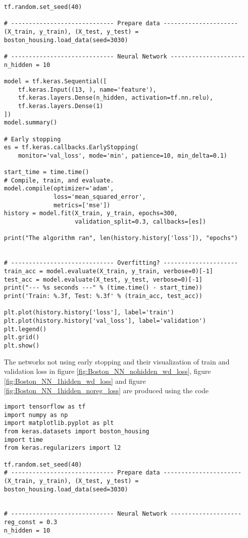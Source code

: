 \begin{appendices}
\begin{lstlisting}
tf.random.set_seed(40)

# ----------------------------- Prepare data ---------------------
(X_train, y_train), (X_test, y_test) = boston_housing.load_data(seed=3030)

# ----------------------------- Neural Network ---------------------
n_hidden = 10

model = tf.keras.Sequential([
    tf.keras.Input((13, ), name='feature'),
    tf.keras.layers.Dense(n_hidden, activation=tf.nn.relu),
    tf.keras.layers.Dense(1)
])
model.summary()

# Early stopping
es = tf.keras.callbacks.EarlyStopping(
    monitor='val_loss', mode='min', patience=10, min_delta=0.1)

start_time = time.time()
# Compile, train, and evaluate.
model.compile(optimizer='adam',
              loss='mean_squared_error',
              metrics=['mse'])
history = model.fit(X_train, y_train, epochs=300,
                    validation_split=0.3, callbacks=[es])

print("The algorithm ran", len(history.history['loss']), "epochs")


# ----------------------------- Overfitting? ---------------------
train_acc = model.evaluate(X_train, y_train, verbose=0)[-1]
test_acc = model.evaluate(X_test, y_test, verbose=0)[-1]
print("--- %s seconds ---" % (time.time() - start_time))
print('Train: %.3f, Test: %.3f' % (train_acc, test_acc))

plt.plot(history.history['loss'], label='train')
plt.plot(history.history['val_loss'], label='validation')
plt.legend()
plt.grid()
plt.show()

\end{lstlisting}
The networks not using early stopping and their visualization of train and validation loss in figure \ref{fig:Boston_NN_nohidden_wd_loss}, figure \ref{fig:Boston_NN_1hidden_wd_loss} and figure \ref{fig:Boston_NN_1hidden_noreg_loss} are produced using the code
\begin{lstlisting}
import tensorflow as tf
import numpy as np
import matplotlib.pyplot as plt
from keras.datasets import boston_housing
import time
from keras.regularizers import l2

tf.random.set_seed(40)
# ----------------------------- Prepare data ----------------------
(X_train, y_train), (X_test, y_test) = boston_housing.load_data(seed=3030)


# ----------------------------- Neural Network --------------------
reg_const = 0.3
n_hidden = 10


\end{lstlisting}
\end{appendices}
